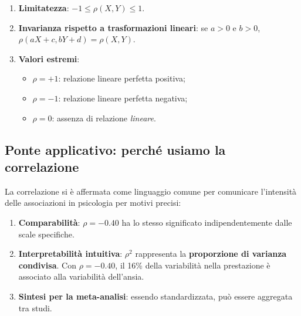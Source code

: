 \documentclass[
  italian,
  letterpaper,
  a4paper,
  11pt,
  open=any]{scrbook}
\providecommand{\tightlist}{%
  \setlength{\itemsep}{0pt}\setlength{\parskip}{0pt}}
\theoremstyle{plain}
\theoremstyle{definition}
\theoremstyle{definition}
\theoremstyle{remark}
\begin{document}
\begin{enumerate}
\def\labelenumi{\arabic{enumi}.}
\item
  \textbf{Limitatezza}: \(-1 \leq \rho(X,Y) \leq 1\).
\item
  \textbf{Invarianza rispetto a trasformazioni lineari}: se \(a > 0\) e
  \(b > 0\), \(\rho(aX + c, bY + d) = \rho(X,Y)\).
\item
  \textbf{Valori estremi}:

  \begin{itemize}
  \tightlist
  \item
    \(\rho = +1\): relazione lineare perfetta positiva;
  \item
    \(\rho = -1\): relazione lineare perfetta negativa;
  \item
    \(\rho = 0\): assenza di relazione \emph{lineare}.
  \end{itemize}
\end{enumerate}

\subsection{Ponte applicativo: perché usiamo la
correlazione}\label{ponte-applicativo-perchuxe9-usiamo-la-correlazione}

La correlazione si è affermata come linguaggio comune per comunicare
l'intensità delle associazioni in psicologia per motivi precisi:

\begin{enumerate}
\def\labelenumi{\arabic{enumi}.}
\item
  \textbf{Comparabilità}: \(\rho = -0.40\) ha lo stesso significato
  indipendentemente dalle scale specifiche.
\item
  \textbf{Interpretabilità intuitiva}: \(\rho^2\) rappresenta la
  \textbf{proporzione di varianza condivisa}. Con \(\rho = -0.40\), il
  16\% della variabilità nella prestazione è associato alla variabilità
  dell'ansia.
\item
  \textbf{Sintesi per la meta-analisi}: essendo standardizzata, può
  essere aggregata tra studi.
\end{enumerate}
\end{document}
